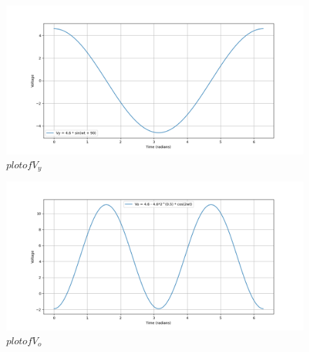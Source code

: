 \documentclass[journal,12pt,twocolumn]{IEEEtran}
\theoremstyle{remark}
\begin{document}
\begin{figure}[h]
      \centering
       \includegraphics[width=1\linewidth]{figs/V_y.png} %
        \caption{$plot of V_y$}
\end{figure}
\begin{figure}[h]
      \centering
       \includegraphics[width=1\linewidth]{figs/V_o.png} %
        \caption{$plot of V_o$}
\end{figure}
\end{document}
